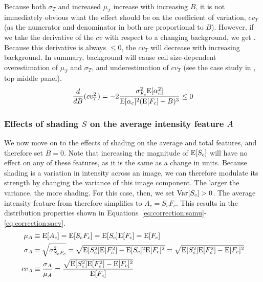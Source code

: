 Because both $\sigma_T$ and increased $\mu_T$ increase with
increasing $B$, it is not immediately obvious what the effect should be on the
coefficient of variation, $cv_T$ (as the numerator and
denominator in  both are proportional to $B$).
However, if we take the derivative of the $cv$ with respect to a changing
background, we get . Because this derivative
is always $\leq 0$, the $cv_T$ will decrease with increasing
background. In summary, background will cause
cell size-dependent overestimation of $\mu_T$ and $\sigma_T$,
and underestimation of $cv_T$ (see the case study in
, top middle panel).
    \begin{equation} \label{eq:correction:btcvdb}
    \frac{d}{dB}(cv_T^2)= -2 \frac{ \sigma^2_{F_c}\mathrm{E}[\alpha_c^2] }
        { \mathrm{E}[\alpha_c]^2(\mathrm{E}[F_c]+B)^3 } \leq 0
    \end{equation}


\subsubsection{Effects of shading $S$ on the average intensity feature $A$}


We now move on to the effects of shading on the average and total features,
and therefore set $B=0$. Note that increasing the magnitude of $\mathrm{E}[S_c]$
will have no effect on any of these features, as it is the same as a change in
units. Because shading is a variation in intensity across an image,
we can therefore modulate its strength by
changing the variance of this image component.
The larger the variance, the more shading. For this case, then,
we set $\mathrm{Var}[S_c]>0$.
The average intensity feature from  therefore
simplifies to $A_c=S_c F_c$.
This results in the distribution properties shown in 
Equations~\ref{eq:correction:samu}\nobreakdash-\ref{eq:correction:sacv}.
    \begin{align}
    \mu_A    & \equiv \mathrm{E}[A_c] = \mathrm{E}[S_c F_c] = \mathrm{E}[S_c]\mathrm{E}[F_c]=\mathrm{E}[F_c]
        \label{eq:correction:samu}\\
    \sigma_A & = \sqrt{\sigma^2_{S_c F_c}} =  \sqrt{ \mathrm{E}[S_c^2]\mathrm{E}[F_c^2]-\mathrm{E}[S_c]^2\mathrm{E}[F_c]^2 }
        = \sqrt{ \mathrm{E}[S_c^2]\mathrm{E}[F_c^2]-\mathrm{E}[F_c]^2 }
        \label{eq:correction:sasd}\\
    cv_A     & \equiv \frac{\sigma_A}{\mu_A} = \frac{ \sqrt{\mathrm{E}[S_c^2]\mathrm{E}[F_c^2]-\mathrm{E}[F_c]^2} }
        { \mathrm{E}[F_c] }
        \label{eq:correction:sacv}
    \end{align}

